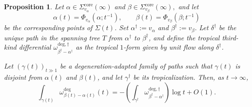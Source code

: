 \documentclass[12pt]{amsart}
\numberwithin{equation}{section}
\newtheorem{proposition}[theorem]{Proposition}
\theoremstyle{definition}
\def\trop{\dagger}
\def\mcurve{\Sigma}
\begin{document}
\begin{proposition}
\label{prop:trop_differential_third_kind}
Let
$
\alpha\in\mcurve_{v_\alpha}^{\mathrm{core}}(\infty)
$
and
$
\beta\in\mcurve_{v_\beta}^{\mathrm{core}}(\infty),
$
and let 
\[
\alpha(t) =\Phi_{v_\alpha}(\alpha;t^{-1}),\qquad \beta(t) =\Phi_{v_\beta}(\beta;t^{-1})
\]
be the corresponding points of
$\mcurve(t)$. Set
$
\alpha^\trop:=v_\alpha$ and $\beta^\trop:=v_\beta.
$
Let $\delta^\trop$ be the unique path in the spanning tree $T$ from
$\alpha^\trop$ to $\beta^\trop$, and define the tropical
third-kind differential $\omega_{\beta^\trop-\alpha^\trop}^{\mathrm{deg},\trop}$ as the tropical $1$-form given by unit flow along $\delta^\trop$.

Let $(\gamma(t))_{t\gg1}$ be a degeneration-adapted family of paths
such that $\gamma(t)$ is disjoint from $\alpha(t)$ and $\beta(t)$, and
let $\gamma^\trop$ be its tropicalization. Then, as $t\to\infty$,
\[
\int_{\gamma(t)}
\omega_{\beta(t)-\alpha(t)}^{\mathrm{deg}}(t)
=
-\left(
\int_{\gamma^\trop}
\omega_{\beta^\trop-\alpha^\trop}^{\mathrm{deg},\trop}
\right)
\log t
+
O(1).
\]
\end{proposition}
\end{document}
